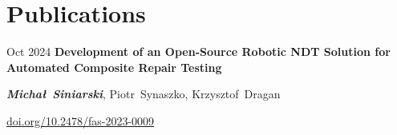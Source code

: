     \section{Publications}

    \begin{samepage}
        \begin{twocolentry}{
            Oct 2024
        }
            \textbf{Development of an Open-Source Robotic NDT Solution for Automated Composite Repair Testing}

            \vspace{0.10 cm}

            \mbox{\textbf{\textit{Michał Siniarski}}}, \mbox{Piotr Synaszko}, \mbox{Krzysztof Dragan}
            \vspace{0.10 cm}

            \href{https://doi.org/10.2478/fas-2023-0009}{doi.org/10.2478/fas-2023-0009}
        \end{twocolentry}
    \end{samepage}
